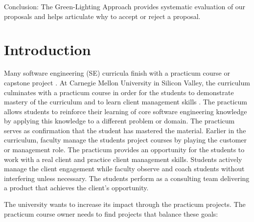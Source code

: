 \documentclass[conference]{IEEEtran}
\begin{document}
Conclusion: The Green-Lighting Approach provides systematic
evaluation of our proposals and helps articulate why to accept or reject a proposal.







%
\IEEEpeerreviewmaketitle


\section{Introduction}
\label{Introduction}

Many software engineering (SE) curricula finish with a practicum course
or capstone project \cite{GSWE}. At Carnegie Mellon
University in Silicon Valley, the curriculum culminates with a practicum
course in order for the students to demonstrate mastery of the
curriculum and to learn client management skills
\cite{Katz}. The practicum allows students to reinforce
their learning of core software engineering knowledge by applying this
knowledge to a different problem or domain. The practicum serves as
confirmation that the student has mastered the material. Earlier in the
curriculum, faculty manage the students project courses by playing the
customer or management role. The practicum provides an opportunity for
the students to work with a real client and practice client management
skills. Students actively manage the client engagement while faculty
observe and coach students without interfering unless necessary. The
students perform as a consulting team delivering a product that achieves
the client's opportunity.

The university wants to increase its impact through the practicum
projects. The practicum course owner needs to find projects that
balance these goals:
\end{document}
